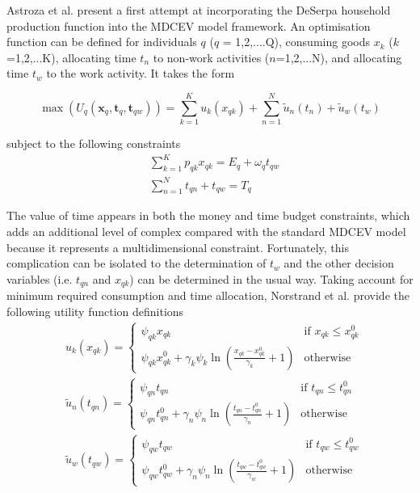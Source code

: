 Astroza et al. \cite{Astroza2017AConsumption} present a first attempt at incorporating the DeSerpa household production function into the MDCEV model framework. An optimisation function can be defined for individuals $q$ ($q$ = 1,2,....Q), consuming goods $x_k$ ($k$=1,2,...K), allocating time $t_n$ to non-work activities ($n$=1,2,...N), and allocating time $t_w$ to the work activity. It takes the form

\begin{equation}
    \max(U_q(\bm{x}_q,\bm{t}_q,\bm{t}_{qw})) = \sum_{k=1}^K u_k(x_{qk}) + \sum_{n=1}^N\widetilde{u}_n(t_n) + \widetilde{u}_w(t_w)
\end{equation}

subject to the following constraints
\begin{subequations}\label{eq:st}
    \begin{align}
        &\sum_{k=1}^K p_{qk}x_{qk} = E_q + \omega_q t_{qw} \\
        &\sum_{n=1}^N t_{qn} + t_{qw} = T_q
    \end{align}
\end{subequations}

The value of time appears in both the money and time budget constraints, which adds an additional level of complex compared with the standard MDCEV model because it represents a multidimensional constraint. Fortunately, this complication can be isolated to the determination of $t_w$ and the other decision variables (i.e. $t_{qn}$ and $x_{qk}$) can be determined in the usual way. Taking account for minimum required consumption and time allocation, Norstrand et al. \cite{VanNostrand2013AnalysisFramework} provide the following utility function definitions
\begin{subequations}\label{eq:util1}
\begin{align}
    &u_k(x_{qk}) = 
    \begin{cases}
    \psi_{qk}x_{qk} & \text{if } x_{qk} \leq x_{qk}^0 \\
    \psi_{qk}x_{qk}^0 + \gamma_k \psi_k \ln \left(\frac{x_{qk} - x_{qk}^0}{\gamma_k}+1\right) & \text{otherwise}
    \end{cases} \\
    &\widetilde{u}_n(t_{qn}) = 
    \begin{cases}
    \psi_{qn}t_{qn} & \text{if } t_{qn} \leq t_{qn}^0 \\
    \psi_{qn}t_{qn}^0 + \gamma_n \psi_n \ln \left(\frac{t_{qn} - t_{qn}^0}{\gamma_n}+1\right) & \text{otherwise}
    \end{cases} \\
    &\widetilde{u}_w(t_{qw}) = 
    \begin{cases}
    \psi_{qw}t_{qw} & \text{if } t_{qw} \leq t_{qw}^0 \\
    \psi_{qw}t_{qw}^0 + \gamma_n \psi_n \ln \left(\frac{t_{qw} - t_{qw}^0}{\gamma_w}+1\right) & \text{otherwise}
    \end{cases}
\end{align}
\end{subequations}

